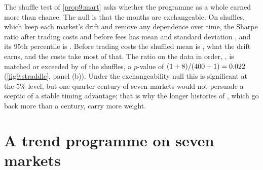 \begin{chapterrefs}
The shuffle test of \cref{prop9:mart} asks whether the programme as a whole earned more than chance.
The null is that the months are exchangeable. On \pmN{} shuffles, which keep each market's drift and
remove any dependence over time, the Sharpe ratio after trading costs and before fees has mean \pmMean{} and standard deviation \pmSd,
and its 95th percentile is \pmQ. Before trading costs the shuffled mean is \pmMeanGross, what the drift
earns, and the costs take most of that. The ratio on the data in order, \tfSR, is matched or exceeded by
\pmCount{} of the shuffles, a $p$-value of $(1+8)/(400+1)=0.022$ (\cref{fig9:straddle}, panel (b)). Under the exchangeability null this is significant at the 5\% level, but one quarter century of
seven markets would not persuade a sceptic of a stable timing advantage; that is why the longer
histories of \textcite{hurst2017}, which go back more than a century, carry more weight.

\FloatBarrier
\section{A trend programme on seven markets}
\label{sec9:programme}


\end{chapterrefs}
